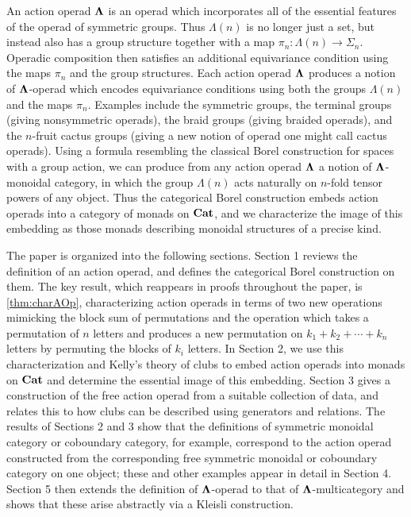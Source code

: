 An action operad $\mathbf{\Lambda}$ is an operad which incorporates all of the essential features of the operad of symmetric groups.  Thus $\Lambda(n)$ is no longer just a set, but instead also has a group structure together with a map $\pi_{n}:\Lambda(n) \to \Sigma_{n}$.  Operadic composition then satisfies an additional equivariance condition using the maps $\pi_n$ and the group structures.  Each action operad $\mathbf{\Lambda}$ produces a notion of $\mathbf{\Lambda}$-operad which encodes equivariance conditions using both the groups $\Lambda(n)$ and the maps $\pi_n$.  Examples include the symmetric groups, the terminal groups (giving nonsymmetric operads), the braid groups (giving braided operads), and the $n$-fruit cactus groups \cite{hk-cobound} (giving a new notion of operad one might call cactus operads).  Using a formula resembling the classical Borel construction for spaces with a group action, we can produce from any action operad $\mathbf{\Lambda}$ a notion of $\mathbf{\Lambda}$-monoidal category, in which the group $\Lambda(n)$ acts naturally on $n$-fold tensor powers of any object.  Thus the categorical Borel construction embeds action operads into a category of monads on $\mathbf{Cat}$, and we characterize the image of this embedding as those monads describing monoidal structures of a precise kind.

The paper is organized into the following sections.  Section 1 reviews the definition of an action operad, and defines the categorical Borel construction on them.  The key result, which reappears in proofs throughout the paper, is \cref{thm:charAOp}, characterizing action operads in terms of two new operations mimicking the block sum of permutations and the operation which takes a permutation of $n$ letters and produces a new permutation on $k_1 + k_2 + \cdots + k_n$ letters by permuting the blocks of $k_i$ letters.  In Section 2, we use this characterization and Kelly's theory of clubs \cite{kelly_club1, kelly_club0, kelly_club2} to embed action operads into monads on $\mathbf{Cat}$ and determine the essential image of this embedding.  Section 3 gives a construction of the free action operad from a suitable collection of data, and relates this to how clubs can be described using generators and relations.  The results of Sections 2 and 3 show that the definitions of symmetric monoidal category or coboundary category, for example, correspond to the action operad constructed from the corresponding free symmetric monoidal or coboundary category on one object; these and other examples appear in detail in Section 4.  Section 5 then extends the definition of $\mathbf{\Lambda}$-operad to that of $\mathbf{\Lambda}$-multicategory and shows that these arise abstractly via a Kleisli construction.


